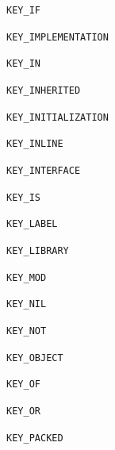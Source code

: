 \documentclass{report}
\begin{document}
\begin{list}{}
\begin{description}
\item[\texttt{KEY{\_}IF}] \label{PasDoc_Tokenizer-KEY_IF}
\index{}
 
\item[\texttt{KEY{\_}IMPLEMENTATION}] \label{PasDoc_Tokenizer-KEY_IMPLEMENTATION}
\index{}
 
\item[\texttt{KEY{\_}IN}] \label{PasDoc_Tokenizer-KEY_IN}
\index{}
 
\item[\texttt{KEY{\_}INHERITED}] \label{PasDoc_Tokenizer-KEY_INHERITED}
\index{}
 
\item[\texttt{KEY{\_}INITIALIZATION}] \label{PasDoc_Tokenizer-KEY_INITIALIZATION}
\index{}
 
\item[\texttt{KEY{\_}INLINE}] \label{PasDoc_Tokenizer-KEY_INLINE}
\index{}
 
\item[\texttt{KEY{\_}INTERFACE}] \label{PasDoc_Tokenizer-KEY_INTERFACE}
\index{}
 
\item[\texttt{KEY{\_}IS}] \label{PasDoc_Tokenizer-KEY_IS}
\index{}
 
\item[\texttt{KEY{\_}LABEL}] \label{PasDoc_Tokenizer-KEY_LABEL}
\index{}
 
\item[\texttt{KEY{\_}LIBRARY}] \label{PasDoc_Tokenizer-KEY_LIBRARY}
\index{}
 
\item[\texttt{KEY{\_}MOD}] \label{PasDoc_Tokenizer-KEY_MOD}
\index{}
 
\item[\texttt{KEY{\_}NIL}] \label{PasDoc_Tokenizer-KEY_NIL}
\index{}
 
\item[\texttt{KEY{\_}NOT}] \label{PasDoc_Tokenizer-KEY_NOT}
\index{}
 
\item[\texttt{KEY{\_}OBJECT}] \label{PasDoc_Tokenizer-KEY_OBJECT}
\index{}
 
\item[\texttt{KEY{\_}OF}] \label{PasDoc_Tokenizer-KEY_OF}
\index{}
 
\item[\texttt{KEY{\_}OR}] \label{PasDoc_Tokenizer-KEY_OR}
\index{}
 
\item[\texttt{KEY{\_}PACKED}] \label{PasDoc_Tokenizer-KEY_PACKED}
\index{}
 

\end{description}
\end{list}
\end{document}
